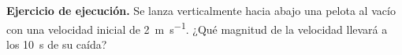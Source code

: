 \documentclass[12pt, letter]{exam}
\begin{document}
\begin{questions}
    \question \label{Ejercicio_05} \textbf{Ejercicio de ejecución.} Se lanza verticalmente hacia abajo una pelota al vacío con una velocidad inicial de \SI{2}{\meter\per\second}. ¿Qué magnitud de la velocidad llevará a los \SI{10}{\second} de su caída?

\end{questions}
\end{document}
